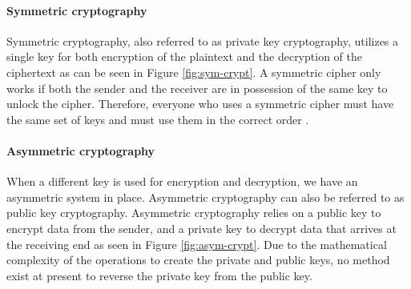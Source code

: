 \paragraph{Symmetric cryptography}
Symmetric cryptography, also referred to as private key cryptography, utilizes a single key for both encryption of the plaintext and the decryption of the ciphertext as can be seen in Figure \ref{fig:sym-crypt}. A symmetric cipher only works if both the sender and the receiver are in possession of the same key to unlock the cipher. Therefore, everyone who uses a symmetric cipher must have the same set of keys and must use them in the correct order \cite{dooley2018history}.


\paragraph{Asymmetric cryptography}
When a different key is used for encryption and decryption, we have an asymmetric system in place. Asymmetric cryptography can also be referred to as public key cryptography. Asymmetric cryptography relies on a public key to encrypt data from the sender, and a private key to decrypt data that arrives at the receiving end as seen in Figure \ref{fig:asym-crypt}. Due to the mathematical complexity of the operations to create the private and public keys, no method exist at present to reverse the private key from the public key.

